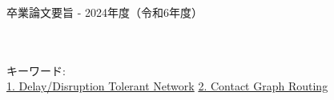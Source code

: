 卒業論文要旨 - 2024年度（令和6年度）
\begin{center}
\begin{large}
\end{large}
\end{center}

~ \\

~ \\
キーワード:\\
\underline{1. Delay/Disruption Tolerant Network} 
\underline{2. Contact Graph Routing} 
\begin{flushright}
\dept \\
\author
\end{flushright}
